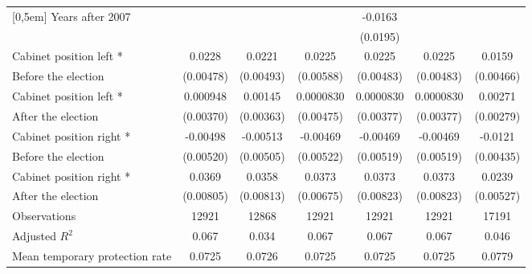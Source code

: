 \begin{table}[!ht]
\begin{tabular}{l*{6}{c}}
[0,5em]
Years after 2007    &                     &                     &                     &     -0.0163         &                     &                     \\
                    &                     &                     &                     &    (0.0195)         &                     &                     \\
[0,5em]
Cabinet position left *&      0.0228\sym{***}&      0.0221\sym{***}&      0.0225\sym{***}&      0.0225\sym{***}&      0.0225\sym{***}&      0.0159\sym{**} \\
 Before the election                    &   (0.00478)         &   (0.00493)         &   (0.00588)         &   (0.00483)         &   (0.00483)         &   (0.00466)         \\
[0,5em]
Cabinet position left * &    0.000948         &     0.00145         &   0.0000830         &   0.0000830         &   0.0000830         &     0.00271         \\
After the election                    &   (0.00370)         &   (0.00363)         &   (0.00475)         &   (0.00377)         &   (0.00377)         &   (0.00279)         \\
[0,5em]
Cabinet position right * &    -0.00498         &    -0.00513         &    -0.00469         &    -0.00469         &    -0.00469         &     -0.0121\sym{**} \\
Before the election                    &   (0.00520)         &   (0.00505)         &   (0.00522)         &   (0.00519)         &   (0.00519)         &   (0.00435)         \\
[0,5em]
Cabinet position right * &      0.0369\sym{***}&      0.0358\sym{***}&      0.0373\sym{***}&      0.0373\sym{***}&      0.0373\sym{***}&      0.0239\sym{***}\\
After the election                    &   (0.00805)         &   (0.00813)         &   (0.00675)         &   (0.00823)         &   (0.00823)         &   (0.00527)         \\
\hline
Observations        &       12921         &       12868         &       12921         &       12921         &       12921         &       17191         \\
Adjusted \(R^{2}\)  &       0.067         &       0.034         &       0.067         &       0.067         &       0.067         &       0.046         \\
Mean temporary protection rate&      0.0725         &      0.0726         &      0.0725         &      0.0725         &      0.0725         &      0.0779         \\

\end{tabular}
\end{table}
